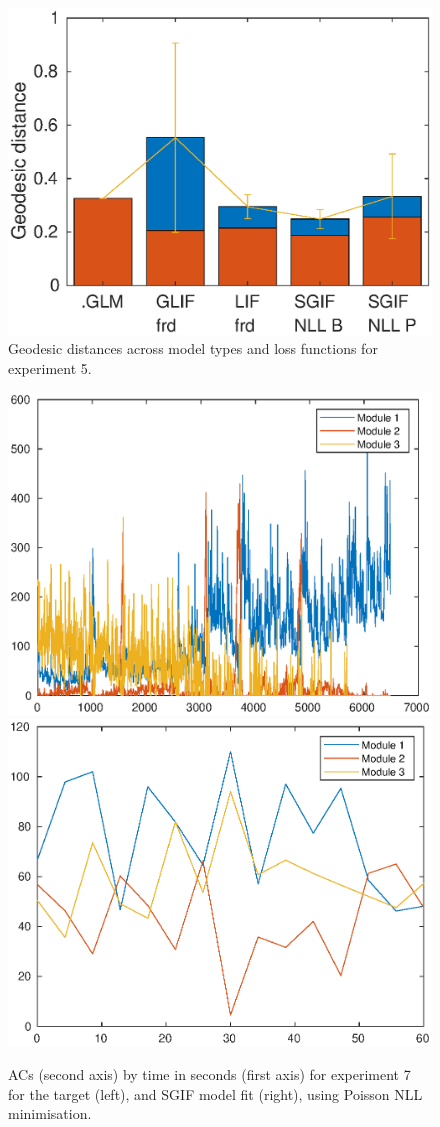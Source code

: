 \documentclass[mphil,deptreport,ianc]{infthesis} %
\begin{document}
\begin{figure}
    \centering
    \includegraphics[width=0.65\columnwidth]{figures/sleep/geodesic_exp138.eps}
    \caption{Geodesic distances across model types and loss functions for experiment 5.}
    \label{fig:geodesic_distances_exp5}
\end{figure}

\begin{figure}
    \centering
    \includegraphics[width=0.49\columnwidth]{figures/sleep/ACs147.eps}
    \includegraphics[width=0.49\columnwidth]{figures/sleep/ACs_nuovo_sleep_v2_spikes_mt_microGIF_euid_12-29_02-12-29-631_exp_6_lfn_poisson_nll.eps}
    \caption{ACs (second axis) by time in seconds (first axis) for experiment 7 for the target (left), and SGIF model fit (right), using Poisson NLL minimisation.}
    \label{fig:ACs_exp7}
\end{figure}
\end{document}
